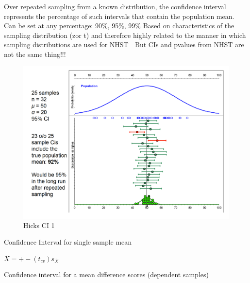 \documentclass[]{book}
\theoremstyle{definition}
\theoremstyle{definition}
\theoremstyle{definition}
\theoremstyle{remark}
\begin{document}
Over repeated sampling from a known distribution, the confidence
interval represents the percentage of such intervals that contain the
population mean. Can be set at any percentage: 90\%, 95\%, 99\% Based on
characteristics of the sampling distribution (zor t) and therefore
highly related to the manner in which sampling distributions are used
for NHST  But CIs and pvalues from NHST are not the same thing!!!

\begin{figure}
\centering
\includegraphics{img/hicksci1.png}
\caption{Hicks CI 1}
\end{figure}

Confidence Interval for single sample mean

\(\bar{X} = +- (t_{cv})s_{\bar{X}}\)

Confidence interval for a mean difference scores (dependent samples)
\end{document}
